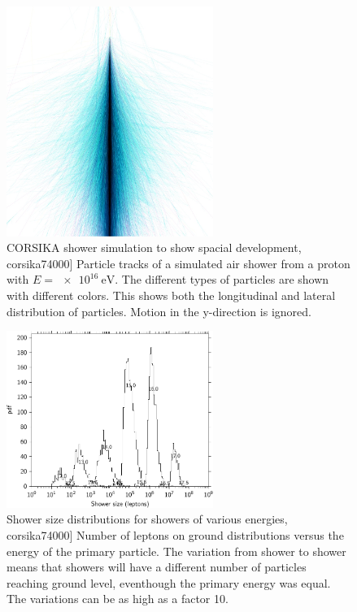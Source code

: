 \begin{figure}
    \centering
    \includegraphics[width=0.6\textwidth]
                    {plots/cosmic-rays/shower.jpg}
    \caption{CORSIKA shower simulation to show spacial development, corsika74000]
Particle tracks of a simulated air shower from a proton with $E = \SI{e16}{\eV}$. The different types of particles are shown with different colors. This shows both the longitudinal and lateral distribution of particles. Motion in the y-direction is ignored.}
    \label{fig:shower}
\end{figure}

\begin{figure}
    \centering
    \includegraphics[width=0.6\textwidth]
                    {plots/cosmic-rays/shower_size_distribution}
    \caption{Shower size distributions for showers of various energies, corsika74000]
Number of leptons on ground distributions versus the energy of the primary particle. The variation from shower to shower means that showers will have a different number of particles reaching ground level, eventhough the primary energy was equal. The variations can be as high as a factor 10.}
    \label{fig:shower_size_distribution}
\end{figure}


